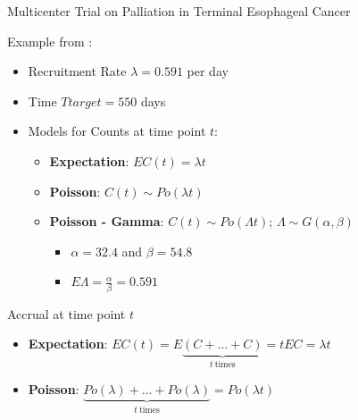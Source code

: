 \documentclass[english]{beamer}\usepackage[]{graphicx}\usepackage[]{xcolor}
\begin{document}
\begin{frame}{Multicenter Trial on Palliation in Terminal Esophageal Cancer}

Example from \cite{carter2004application}:
\begin{itemize}
\item Recruitment Rate $\lambda = 0.591$ per day
\item Time $Ttarget = 550$ days
\item Models for Counts at time point $t$:
	\begin{itemize}
	\item \textbf{Expectation}: $EC(t) = \lambda t$
	\item \textbf{Poisson}: $C(t) \sim Po(\lambda t)$
	\item \textbf{Poisson - Gamma}: $C(t) \sim Po (\Lambda t)$; $\Lambda \sim G(\alpha,\beta)$
	\begin{itemize}
	\item $\alpha = 32.4$ and $\beta = 54.8$
	\item $E\Lambda = \frac{\alpha}{\beta} = 0.591$
	\end{itemize}
	\end{itemize}
\end{itemize}

\end{frame}




\begin{frame}{Accrual at time point $t$}
\begin{itemize}
\item \textbf{Expectation}: $EC(t) = E\underbrace{(C +\ldots + C)}_{t \ \text{times}} = t E C = \lambda t$
\item \textbf{Poisson}: $\underbrace{Po (\lambda) +\ldots +Po (\lambda)}_{t \ \text{times}} = Po (\lambda t)$
\end{itemize}
\end{frame}
\end{document}
